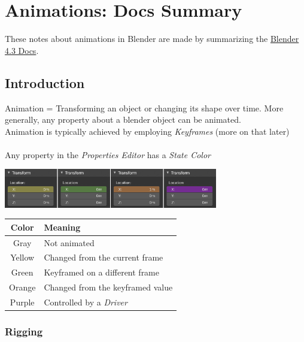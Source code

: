 \documentclass{article}
\begin{document}
\section{Animations: Docs Summary}
These notes about animations in Blender are made by summarizing the \href{https://docs.blender.org/manual/en/4.3/animation/introduction.html}{Blender 4.3 Docs}.

\subsection{Introduction}

Animation = Transforming an object or changing its shape over time. More generally, any property about a blender object can be animated. \\
Animation is typically achieved by employing \textit{Keyframes} (more on that later) \\\\
Any property in the \textit{Properties Editor} has a \textit{State Color}

\begin{center}
    \includegraphics[width=0.7\textwidth]{blender_docs_images/animation_introduction_state-colors.png}
\end{center}

\begin{longtable}{cl}
    \toprule
    \textbf{Color} & \textbf{Meaning}                 \\
    \midrule
    \endhead
    \bottomrule
    \endfoot

    Gray           & Not animated                     \\
    Yellow         & Changed from the current frame   \\
    Green          & Keyframed on a different frame   \\
    Orange         & Changed from the keyframed value \\
    Purple         & Controlled by a \textit{Driver}  \\
\end{longtable}

\subsubsection{Rigging}
\end{document}
